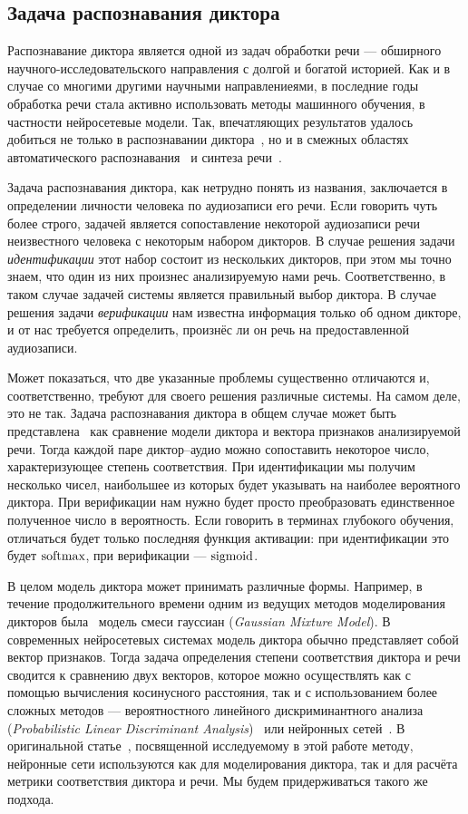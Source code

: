 \subsection{Задача распознавания диктора}

Распознавание диктора является одной из задач обработки речи --- обширного
научного-исследовательского направления с долгой и богатой историей. Как и в
случае со многими другими научными направлениеями, в последние годы обработка
речи стала активно использовать методы машинного обучения, в частности
нейросетевые модели. Так, впечатляющих результатов удалось добиться не только в
распознавании диктора~\cite{xvectorspaper,sincnet}, но и в смежных областях
автоматического распознавания~\cite{wav2vec2} и синтеза речи~\cite{tacotron2}.

Задача распознавания диктора, как нетрудно понять из названия, заключается в
определении личности человека по аудиозаписи его речи. Если говорить чуть
более строго, задачей является сопоставление некоторой аудиозаписи речи
неизвестного человека с некоторым набором дикторов. В случае решения задачи
\emph{идентификации} этот набор состоит из нескольких дикторов, при этом мы
точно знаем, что один из них произнес анализируемую нами речь. Соответственно,
в таком случае задачей системы является правильный выбор диктора. В случае
решения задачи \emph{верификации} нам известна информация только об одном
дикторе, и от нас требуется определить, произнёс ли он речь на предоставленной
аудиозаписи.

Может показаться, что две указанные проблемы существенно отличаются и,
соответственно, требуют для своего решения различные системы. На самом деле,
это не так. Задача распознавания диктора в общем случае может быть
представлена~\cite{sr_chapter} как сравнение модели диктора и вектора признаков
анализируемой речи. Тогда каждой паре диктор--аудио можно сопоставить некоторое
число, характеризующее степень соответствия. При идентификации мы получим
несколько чисел, наибольшее из которых будет указывать на наиболее вероятного
диктора. При верификации нам нужно будет просто преобразовать единственное
полученное число в вероятность. Если говорить в терминах глубокого обучения,
отличаться будет только последняя функция активации: при идентификации это будет
$\operatorname{\text{softmax}}$, при верификации --- $\operatorname{\text{sigmoid}}$.

В целом модель диктора может принимать различные формы. Например, в течение
продолжительного времени одним из ведущих методов моделирования дикторов
была~\cite{sr_chapter} модель смеси гауссиан (\textit{Gaussian Mixture Model}).
В современных нейросетевых системах модель диктора обычно представляет собой
вектор признаков. Тогда задача определения степени соответствия диктора и речи
сводится к сравнению двух векторов, которое можно осуществлять как с помощью
вычисления косинусного расстояния, так и с использованием более сложных методов
--- вероятностного линейного дискриминантного анализа (\textit{Probabilistic
Linear Discriminant Analysis})~\cite{PLDA} или нейронных сетей~\cite{Zeng_2022}.
В оригинальной статье~\citeisr{}, посвященной исследуемому в этой работе методу,
нейронные сети используются как для моделирования диктора, так и для расчёта
метрики соответствия диктора и речи.  Мы будем придерживаться такого же подхода.

